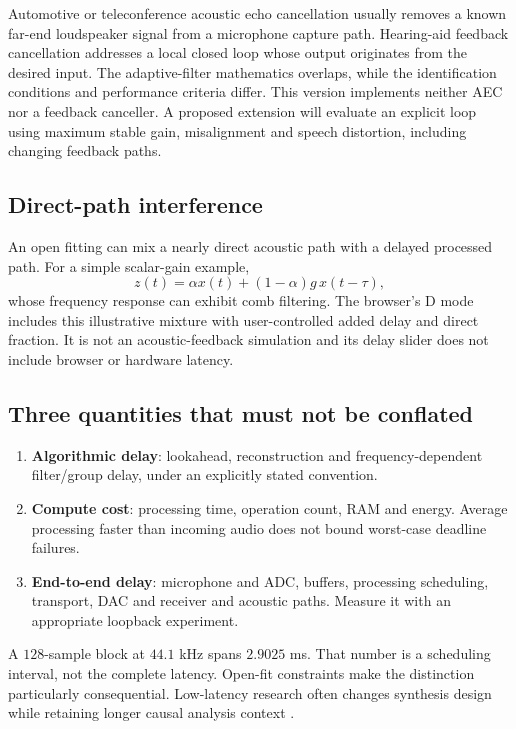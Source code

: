 \documentclass[11pt,a4paper]{article}
\begin{document}
Automotive or teleconference acoustic echo cancellation usually removes a known far-end loudspeaker signal from a microphone capture path. Hearing-aid feedback cancellation addresses a local closed loop whose output originates from the desired input. The adaptive-filter mathematics overlaps, while the identification conditions and performance criteria differ. This version implements neither AEC nor a feedback canceller. A proposed extension will evaluate an explicit loop using maximum stable gain, misalignment and speech distortion, including changing feedback paths.

\subsection{Direct-path interference}
An open fitting can mix a nearly direct acoustic path with a delayed processed path. For a simple scalar-gain example,
\begin{equation}
 z(t)=\alpha x(t)+(1-\alpha)g\,x(t-\tau),
\end{equation}
whose frequency response can exhibit comb filtering. The browser's D mode includes this illustrative mixture with user-controlled added delay and direct fraction. It is not an acoustic-feedback simulation and its delay slider does not include browser or hardware latency.

\subsection{Three quantities that must not be conflated}
\begin{enumerate}
\item \textbf{Algorithmic delay}: lookahead, reconstruction and frequency-dependent filter/group delay, under an explicitly stated convention.
\item \textbf{Compute cost}: processing time, operation count, RAM and energy. Average processing faster than incoming audio does not bound worst-case deadline failures.
\item \textbf{End-to-end delay}: microphone and ADC, buffers, processing scheduling, transport, DAC and receiver and acoustic paths. Measure it with an appropriate loopback experiment.
\end{enumerate}

A $128$-sample block at $44.1$ kHz spans $2.9025$ ms. That number is a scheduling interval, not the complete latency. Open-fit constraints make the distinction particularly consequential. Low-latency research often changes synthesis design while retaining longer causal analysis context \cite{wu2025,deepfir}.
\end{document}
